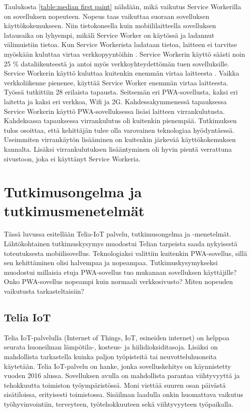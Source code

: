 \documentclass{tktltiki}
\begin{document}
Taulukosta \ref{table:median first paint} nähdään, mikä vaikutus Service Workerilla on sovelluksen nopeuteen. Nopeus taas vaikuttaa suoraan sovelluksen käyttökokemukseen. Niin tietokoneella kuin mobiililaitteella sovelluksen latausaika on lyhyempi, mikäli Service Worker on käytössä ja ladannut välimuistiin tietoa. Kun Service Workerista ladataan tietoa, laitteen ei tarvitse myöskään kuluttaa virtaa verkkopyyntöihin \cite{8456349}. Service Workerin käyttö säästi noin 25 \% dataliikenteestä ja antoi myös verkkoyhteydettömän tuen sovelluksille. Service Workerin käyttö kuluttaa kuitenkin enemmän virtaa laitteesta \cite{malavolta2017assessing}. Vaikka verkkoliikenne pienenee, käyttää Service Worker enemmän virtaa laitteesta. Työssä tutkittiin 28 erilaista tapausta. Seitsemän eri PWA-sovellusta, kaksi eri laitetta ja kaksi eri verkkoa, Wifi ja 2G. Kahdessakymmenessä tapauksessa Service Workerin käyttö PWA-sovelluksessa lisäsi laitteen virrankulutusta. Kahdeksassa tapauksessa virrankulutus oli kuitenkin pienempää. Tutkimuksen tulos osoittaa, että kehittäjän tulee olla varovainen teknologiaa hyödyntäessä. Useimmiten virrankäytön lisääminen on kuitenkin järkevää käyttökokemuksen kannalta. Lisäksi virrankulutuksen lisääntyminen oli hyvin pientä verrattuna sivustoon, joka ei käyttänyt Service Workeria.

\newpage
\section{Tutkimusongelma ja tutkimusmenetelmät}

Tässä luvussa esitellään Telia-IoT palvelu, tutkimusongelma ja -menetelmät. Lähtökohtainen tutkimuskysymys muodostui Telian tarpeista saada nykyisestä toteutuksesta mobiilisovellus. Teknologiaksi valittiin kuitenkin PWA-sovellus, sillä sen kehittäminen olisi halvempaa ja nopeampaa. Tutkimuskysymykseksi muodostui millaisia etuja PWA-sovellus tuo mukanaan sovelluksen käyttäjille? Onko PWA-sovellus nopeampi kuin normaali verkkosivusto? Miten nopeuden vaikutusta tarkasteltaisiin?

\subsection{Telia IoT}

Telia IoT-palvelulla (Internet of Things, IoT, esineiden internet) on helppoa seurata huoneilman lämpötila-, kosteus- ja hiilidioksiditasoja. Lisäksi on mahdollista tarkastella kuinka paljon työpisteitä tai neuvotteluhuoneita käytetään. Telia IoT-palvelu on hanke, jonka sovelluskehitys on käynnistetty vuoden 2016 alussa. Sovelluksen avulla on mahdollista parantaa viihtyvyyttä ja tehokkuutta toimiston työympäristössä. Moni viettää suuren osan päivästä sisätiloissa, erityisesti toimistossa. Sisäilman laadulla onkin huomattava vaikutus työhyvinvointiin, terveyteen, työtehokkuuteen sekä viihtyvyyteen työpaikalla. 
\end{document}
